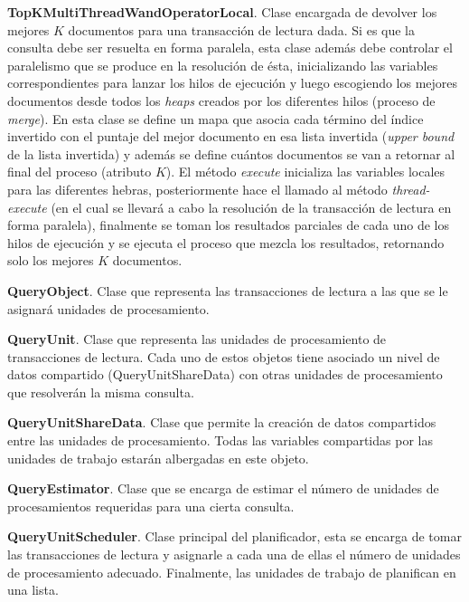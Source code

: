 \begin{list}{}{}
	\item \textbf{TopKMultiThreadWandOperatorLocal}. Clase encargada de devolver los mejores $K$ documentos para una transacción de lectura dada. Si es que la consulta debe ser resuelta en forma paralela, esta clase además debe controlar el paralelismo que se produce en la resolución de ésta, inicializando las variables correspondientes para lanzar los hilos de ejecución y luego escogiendo los mejores documentos desde todos los \textit{heaps} creados por los diferentes hilos (proceso de \textit{merge}). En esta clase se define un mapa que asocia cada término del índice invertido con el puntaje del mejor documento en esa lista invertida (\textit{upper bound} de la lista invertida) y además se define cuántos documentos se van a retornar al final del proceso (atributo $K$). El método \textit{execute} inicializa las variables locales para las diferentes hebras, posteriormente hace el llamado al método \emph{thread-execute} (en el cual se llevará a cabo la resolución de la transacción de lectura en forma paralela), finalmente se toman los resultados parciales de cada uno de los hilos de ejecución y se ejecuta el proceso que mezcla los resultados, retornando solo los mejores $K$ documentos. 
	
	\item \textbf{QueryObject}. Clase que representa las transacciones de lectura a las que se le asignará unidades de procesamiento.
	
	\item \textbf{QueryUnit}. Clase que representa las unidades de procesamiento de transacciones de lectura. Cada uno de estos objetos tiene asociado un nivel de datos compartido (QueryUnitShareData) con otras unidades de procesamiento que resolverán la misma consulta.
			
	\item \textbf{QueryUnitShareData}. Clase que permite la creación de datos compartidos entre las unidades de procesamiento. Todas las variables compartidas por las unidades de trabajo estarán albergadas en este objeto. 
	
	\item \textbf{QueryEstimator}. Clase que se encarga de estimar el número de unidades de procesamientos requeridas para una cierta consulta.
	 
	\item \textbf{QueryUnitScheduler}. Clase principal del planificador, esta se encarga de tomar las transacciones de lectura y asignarle a cada una de ellas el número de unidades de procesamiento adecuado. Finalmente, las unidades de trabajo de planifican en una lista.
\end{list}

